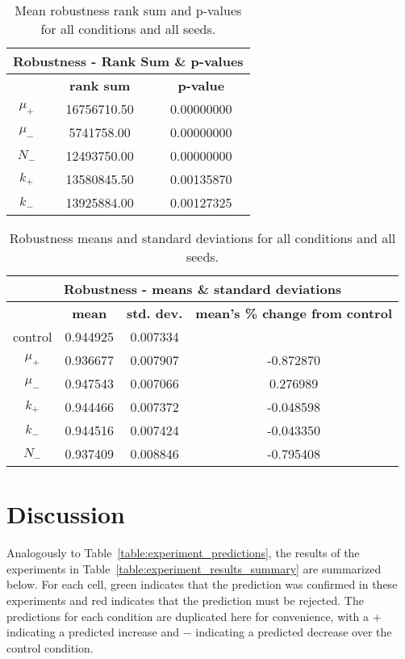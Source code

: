 \begin{table}
	\begin{tabular}{|c|c|c|}
		\hline
		\multicolumn{3}{c}{\Large \textbf{Robustness - Rank Sum \& p-values}} \\
		\hline
		& \textbf{rank sum} & \textbf{p-value} \\
		\hline
		\hline
		$\mu_+$ & 16756710.50 & 0.00000000 \\ 
		\hline
		$\mu_-$ & 5741758.00 & 0.00000000 \\ 
		\hline
		$N_-$ & 12493750.00 & 0.00000000 \\ 
		\hline
		$k_+$ & 13580845.50 & 0.00135870 \\ 
		\hline
		$k_-$ & 13925884.00 & 0.00127325 \\ 
		\hline
	\end{tabular}
	\caption[Robustness rank sum \& p-values]{Mean robustness rank sum and p-values for all conditions and all seeds.}
	\label{table:rank_sum_p-values}
\end{table}
\begin{table}[H]
	\begin{tabular}{|c|c|c|c|}
		\hline
		\multicolumn{4}{c}{\Large \textbf{Robustness - means \& standard deviations}} \\
		\hline
		& \textbf{mean} & \textbf{std. dev.} & \textbf{mean's \% change from control} \\
		\hline
		control & 0.944925 & 0.007334 & \textemdash \\ 
		\hline
		$\mu_+$ & 0.936677 & 0.007907 & -0.872870 \\ 
		\hline
		$\mu_-$ & 0.947543 & 0.007066 & 0.276989 \\ 
		\hline
		$k_+$ & 0.944466 & 0.007372 & -0.048598 \\ 
		\hline
		$k_-$ & 0.944516 & 0.007424 & -0.043350 \\ 
		\hline
		$N_-$ & 0.937409 & 0.008846 & -0.795408 \\ 
		\hline
	\end{tabular}
	\caption[Robustness means and standard deviations]{Robustness means and standard deviations for all conditions and all seeds.}
	\label{table:robustness_means_and_std_dev}
\end{table}


\section{Discussion}\label{discussion}

Analogously to Table~\ref{table:experiment_predictions}, the results of the experiments in Table~\ref{table:experiment_results_summary} are summarized below. For each cell, {\color{green} green} indicates that the prediction was confirmed in these experiments and {\color{red}red} indicates that the prediction must be rejected. The predictions for each condition are duplicated here for convenience, with a $+$ indicating a predicted increase and $-$ indicating a predicted decrease over the control condition. 

